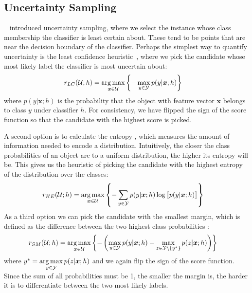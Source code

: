 \documentclass[fleqn,10pt,lineno]{wlpeerj} %
\newcommand{\Y}{\mathcal{Y}}
\newcommand{\Unlabeled}{\mathcal{U}}
\newcommand*{\argmax}{\operatornamewithlimits{arg\,max}\limits}
\begin{document}
\subsection{Uncertainty Sampling}~\label{subsec:uncertainty}
\cite{lewis94} introduced uncertainty sampling, where we select the instance
whose class membership the classifier is least certain about. These tend to be
points that are near the decision boundary of the classifier. Perhaps the
simplest way to quantify uncertainty is the least confidence
heuristic~\citep{culotta05}, where we pick the candidate whose most likely
label the classifier is most uncertain about:
\begin{align}
	r_{LC}(\Unlabeled; h) &= \argmax_{\bm{x} \in \Unlabeled}
	\left\{ - \max_{y \in \Y} p(y | \bm{x}; h) \right\}
\end{align}
where $p(y | \bm{x}; h)$ is the probability that the object with feature vector
$\bm{x}$ belongs to class $y$ under classifier $h$. For consistency, we have
flipped the sign of the score function so that the candidate with the highest
score is picked.

A second option is to calculate the entropy \citep{shannon48}, which measures
the amount of information needed to encode a distribution. Intuitively, the
closer the class probabilities of an object are to a uniform distribution, the
higher its entropy will be. This gives us the heuristic of picking the
candidate with the highest entropy of the distribution over the classes:
\begin{align}
	r_{HE}(\Unlabeled; h) &= \argmax_{\bm{x} \in \Unlabeled}
	\left\{ - \sum_{y \in \Y} p(y | \bm{x}; h)
	\log \big[ p(y | \bm{x}; h) \big] \right\}
\end{align}
As a third option we can pick the candidate with the smallest margin, which is defined as
the difference between the two highest class probabilities \citep{scheffer01}:
\begin{align}
	r_{SM}(\Unlabeled; h) &= \argmax_{\bm{x} \in \Unlabeled}
	\left\{ - \left ( \max_{y \in \Y} p(y | \bm{x}; h) -
	\max_{z \in \Y \setminus \{y^*\}} p(z | \bm{x}; h) \right) \right\}
\end{align}
where $y^* = \argmax_{y \in \Y} p(z | \bm{x}; h)$ and we again flip the sign of
the score function. Since the sum of all probabilities must be 1, the smaller
the margin is, the harder it is to differentiate between the two most likely
labels.
\end{document}
